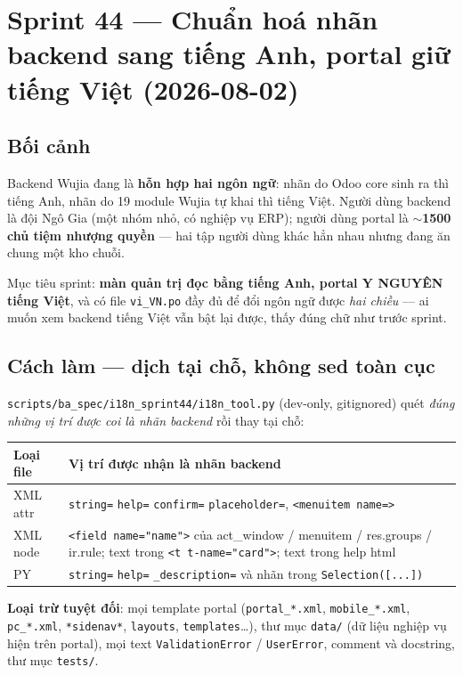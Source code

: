 \chapter{Sprint 44 --- Chuẩn hoá nhãn backend sang tiếng Anh, portal giữ tiếng Việt (2026-08-02)}

\section{Bối cảnh}

Backend Wujia đang là \textbf{hỗn hợp hai ngôn ngữ}: nhãn do Odoo core sinh ra thì tiếng Anh, nhãn do
19 module Wujia tự khai thì tiếng Việt. Người dùng backend là đội Ngô Gia (một nhóm nhỏ, có nghiệp vụ
ERP); người dùng portal là \textbf{$\sim$1500 chủ tiệm nhượng quyền} --- hai tập người dùng khác hẳn
nhau nhưng đang ăn chung một kho chuỗi.

Mục tiêu sprint: \textbf{màn quản trị đọc bằng tiếng Anh, portal Y NGUYÊN tiếng Việt}, và có file
\texttt{vi\_VN.po} đầy đủ để đổi ngôn ngữ được \emph{hai chiều} --- ai muốn xem backend tiếng Việt
vẫn bật lại được, thấy đúng chữ như trước sprint.

\section{Cách làm --- dịch tại chỗ, không sed toàn cục}

\texttt{scripts/ba\_spec/i18n\_sprint44/i18n\_tool.py} (dev-only, gitignored) quét \emph{đúng những
vị trí được coi là nhãn backend} rồi thay tại chỗ:

\begin{center}
\begin{tabular}{p{3.2cm}p{10.6cm}}
\hline
\textbf{Loại file} & \textbf{Vị trí được nhận là nhãn backend} \\
\hline
XML attr & \texttt{string=} \texttt{help=} \texttt{confirm=} \texttt{placeholder=},
  \texttt{<menuitem name=>} \\
XML node & \texttt{<field name="name">} của act\_window / menuitem / res.groups / ir.rule; text
  trong \texttt{<t t-name="card">}; text trong help html \\
PY & \texttt{string=} \texttt{help=} \texttt{\_description=} và nhãn trong \texttt{Selection([...])} \\
\hline
\end{tabular}
\end{center}

\textbf{Loại trừ tuyệt đối}: mọi template portal (\texttt{portal\_*.xml}, \texttt{mobile\_*.xml},
\texttt{pc\_*.xml}, \texttt{*sidenav*}, \texttt{layouts}, \texttt{templates}\ldots), thư mục
\texttt{data/} (dữ liệu nghiệp vụ hiện trên portal), mọi text \texttt{ValidationError} /
\texttt{UserError}, comment và docstring, thư mục \texttt{tests/}.

